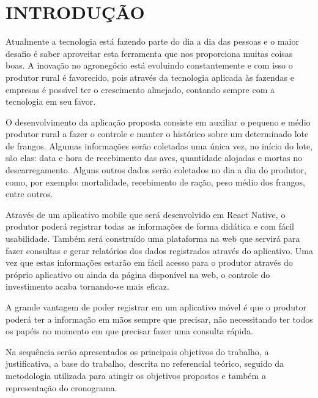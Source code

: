 
\chapter{INTRODUÇÃO}
\label{chap:introducao}




Atualmente a tecnologia está fazendo parte do dia a dia das pessoas e o maior desafio é saber aproveitar esta ferramenta que nos proporciona muitas coisas boas. A inovação no agronegócio está evoluindo constantemente e com isso o produtor rural é favorecido, pois através da tecnologia aplicada às fazendas e empresas é possível ter o crescimento almejado, contando sempre com a tecnologia em seu favor.

O desenvolvimento da aplicação proposta consiste em auxiliar o pequeno e médio produtor rural a fazer o controle e manter o histórico sobre um determinado lote de frangos. Algumas informações serão coletadas uma única vez, no início do lote, são elas: data e hora de recebimento das aves, quantidade alojadas e mortas no descarregamento. Alguns outros dados serão coletados no dia a dia do produtor, como, por exemplo: mortalidade, recebimento de ração, peso médio dos frangos, entre outros.

Através de um aplicativo mobile que será desenvolvido em React Native, o produtor poderá registrar todas as informações de forma didática e com fácil usabilidade. Também será construído uma plataforma na web que servirá para fazer consultas e gerar relatórios dos dados registrados através do aplicativo.
Uma vez que estas informações estarão em fácil acesso para o produtor através do próprio aplicativo ou ainda da página disponível na web, o controle do investimento acaba tornando-se mais eficaz.


A grande vantagem de poder registrar em um aplicativo móvel é que o produtor poderá ter a informação em mãos sempre que precisar, não necessitando ter todos os papéis no momento em que precisar fazer uma consulta rápida.

Na sequência serão apresentados os principais objetivos do trabalho, a justificativa, a base do trabalho, descrita no referencial teórico, seguido da metodologia utilizada para atingir os objetivos propostos e também a representação do cronograma.